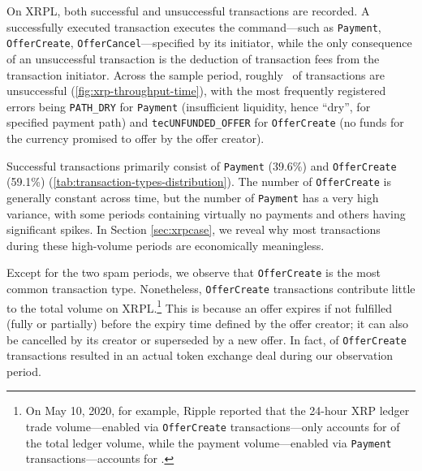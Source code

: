 On XRPL, both successful and unsuccessful transactions are recorded. A successfully executed transaction executes the command---such as \texttt{Payment}, \texttt{OfferCreate}, \texttt{OfferCancel}---specified by its initiator, while the only consequence of an unsuccessful transaction is the deduction of transaction fees from the transaction initiator.
Across the sample period, roughly~ of transactions are unsuccessful (\autoref{fig:xrp-throughput-time}), with the most frequently registered errors being \texttt{PATH\_DRY} for \texttt{Payment} (insufficient liquidity, hence ``dry'', for specified payment path) and \texttt{tecUNFUNDED\_OFFER} for \texttt{OfferCreate} (no funds for the currency promised to offer by the offer creator). 

Successful transactions primarily consist of \texttt{Payment} (39.6\%) and \texttt{OfferCreate} (59.1\%) (\autoref{tab:transaction-types-distribution}). The number of \texttt{OfferCreate} is generally constant across time, but the number of \texttt{Payment} has a very high variance, with some periods containing virtually no payments and others having significant spikes. 
In Section \ref{sec:xrpcase}, we reveal why most transactions during these high-volume periods are economically meaningless. 

Except for the two spam periods, we observe that \texttt{OfferCreate} is the most common transaction type. 
Nonetheless, \texttt{OfferCreate} transactions contribute little to the total volume on XRPL.\footnote{
On May 10, 2020, for example, Ripple reported that the 24-hour XRP ledger trade volume---enabled via \texttt{OfferCreate} transactions---only accounts for  of the total ledger volume, while the payment volume---enabled via \texttt{Payment} transactions---accounts for .
} This is because an offer expires if not fulfilled (fully or partially) before the expiry time defined by the offer creator; it can also be cancelled by its creator or superseded by a new offer. In fact,  of \texttt{OfferCreate} transactions resulted in an actual token exchange deal during our observation period. 



